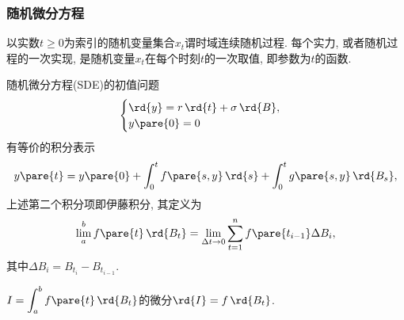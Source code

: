 \documentclass{ctexart}
\begin{document}

\subsubsection{随机微分方程} %
\label{ssub:随机微分方程}

以实数$t\ge 0$为索引的随机变量集合$x_t$谓时域连续随机过程. 每个实力, 或者随机过程的一次实现, 是随机变量$x_t$在每个时刻$t$的一次取值, 即参数为$t$的函数.
\par
随机微分方程(SDE)的初值问题
\[ \begin{cases}
    \rd{y} = r\,\rd{t} + \sigma\,\rd{B}, \\
    y\pare{0} = 0
\end{cases} \]
有等价的积分表示
\[ y\pare{t} = y\pare{0} + \int_0^t f\pare{s,y}\,\rd{s} + \int_0^t g\pare{s,y}\,\rd{B_s}, \]
上述第二个积分项即伊藤积分, 其定义为
\[ \lim_a^b f\pare{t}\,\rd{B_t} = \lim_{\Delta t\rightarrow 0} \sum_{t=1}^n f\pare{t_{i-1}}\Delta B_i, \]
其中$\Delta B_i = B_{t_i} - B_{t_{i-1}}$.
\par
$\displaystyle I = \int_a^b f\pare{t}\,\rd{B_t}$的微分$\rd{I} = f\,\rd{B_t}$.



\end{document}
